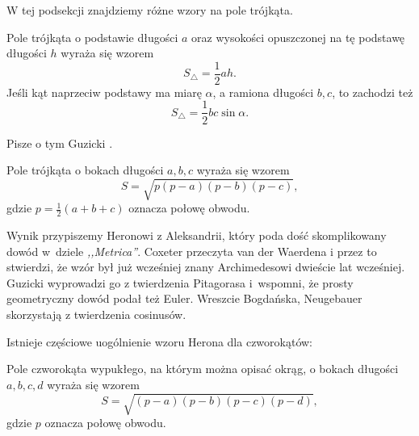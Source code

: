 %

W tej podsekcji znajdziemy różne wzory na pole trójkąta.

\begin{proposition}
    Pole trójkąta o podstawie długości $a$ oraz wysokości opuszczonej na tę podstawę długości $h$ wyraża się wzorem
    \begin{equation}
        S_\triangle = \frac 1 2 a h.
    \end{equation}
    Jeśli kąt naprzeciw podstawy ma miarę $\alpha$, a ramiona długości $b, c$, to zachodzi też
    \begin{equation}
        S_\triangle = \frac 1 2 bc \sin \alpha.
    \end{equation}
\end{proposition}

Pisze o tym Guzicki \cite[s. 255]{guzicki_2021}.


\begin{proposition}
\label{prp_heron}%
    Pole trójkąta o bokach długości $a, b, c$ wyraża się wzorem
    \begin{equation}
        S = \sqrt{p(p-a)(p-b)(p-c)},
    \end{equation}
    gdzie $p = \frac 1 2 (a + b + c)$ oznacza połowę obwodu.
\end{proposition}

Wynik przypiszemy Heronowi z Aleksandrii, który poda dość skomplikowany dowód w~dziele \emph{,,Metrica''}.
%
Coxeter \cite[s. 12]{coxeter_1991} przeczyta van der Waerdena \cite[s. 228, 277]{waerden_1961} i przez to stwierdzi, że wzór był już wcześniej znany Archimedesowi dwieście lat wcześniej.
%
Guzicki \cite[s. 165-169]{guzicki_2021} wyprowadzi go z twierdzenia Pitagorasa i~wspomni, że prosty geometryczny dowód podał też Euler.
%
Wreszcie Bogdańska, Neugebauer \cite[s. 92]{neugebauer_2018} skorzystają z twierdzenia cosinusów.

Istnieje częściowe uogólnienie wzoru Herona dla czworokątów:

\begin{proposition}
    \label{brahmagupta_formula}%
    Pole czworokąta wypukłego, na którym można opisać okrąg, o bokach długości $a, b, c, d$ wyraża się wzorem
    \begin{equation}
        S = \sqrt{(p-a)(p-b)(p-c)(p-d)},
    \end{equation}
    gdzie $p$ oznacza połowę obwodu.
\end{proposition}
%

